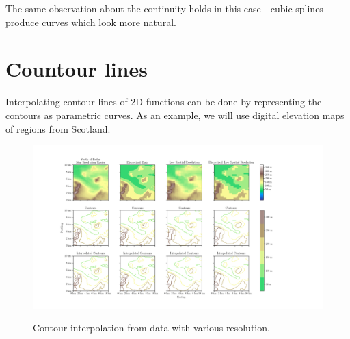 \documentclass[a4paper,10pt]{report}
\begin{document}
The same observation about the continuity holds in this case - cubic splines produce curves which look more natural.

\section{Countour lines}
Interpolating contour lines of 2D functions can be done by representing the contours as parametric curves. As an example, we will use digital elevation maps of regions from Scotland.



\begin{figure}[H]
 \centering
 \includegraphics[width=1\textwidth]{../images/NO44/2D_Contour_Interpolation.png}
 \label{fig:2D_contour}
 \caption{Contour interpolation from data with various resolution.}
\end{figure}
\end{document}
